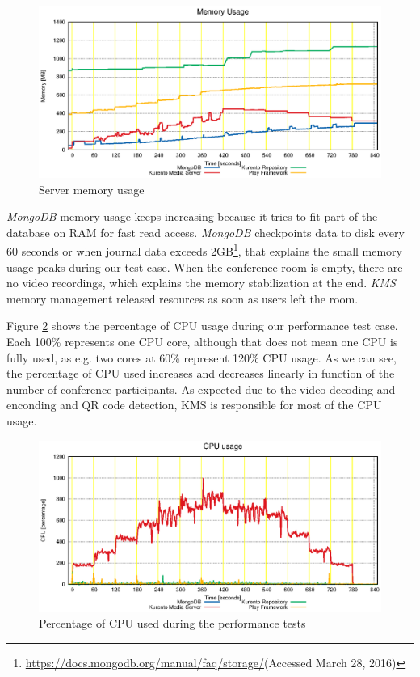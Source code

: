\documentclass[10pt,conference]{IEEEtran}
\begin{document}
\begin{figure}
  \centering
  \includegraphics[width=\linewidth]{stats/test_ram_fixed_mem.eps}
  \caption{Server memory usage}
  \label{fig:test_ram_fixed_mem}
\end{figure}

\emph{MongoDB} memory usage keeps increasing because it tries to fit part of the database on \gls{RAM} for fast read access.
\emph{MongoDB} checkpoints data to disk every 60 seconds or when journal data exceeds 2GB\footnote{\url{https://docs.mongodb.org/manual/faq/storage/}(Accessed March 28, 2016)}, that explains the small memory usage peaks during our test case.
When the conference room is empty, there are no video recordings, which explains the memory stabilization at the end.
\emph{KMS} memory management released resources as soon as users left the room. 


Figure \ref{fig:test_full_features_cpu} shows the percentage of \gls{CPU} usage during our performance test case. 
Each 100\% represents one \gls{CPU} core, although that does not mean one \gls{CPU} is fully used, as e.g. two cores at 60\% represent 120\% \gls{CPU} usage.
As we can see, the percentage of \gls{CPU} used increases and decreases linearly in function of the number of conference participants.
As expected due to the video decoding and enconding and \gls{QR} code detection, \gls{KMS} is responsible for most of the \gls{CPU} usage.


\begin{figure}
  \centering
  \includegraphics[width=\linewidth]{stats/test_full_features_cpu.eps}
  \caption{Percentage of CPU used during the performance tests}
  \label{fig:test_full_features_cpu}
\end{figure}
\end{document}
